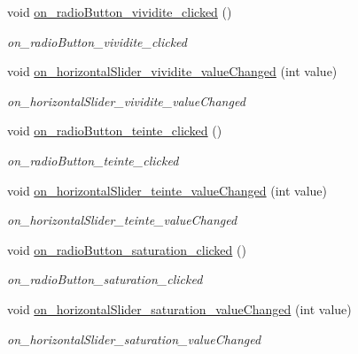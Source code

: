 \begin{DoxyCompactItemize}
\mbox{\label{classMainWindow_a56fc0fe0a0c6150aef0d877f219d666d}} 
void \hyperlink{classMainWindow_a56fc0fe0a0c6150aef0d877f219d666d}{on\+\_\+radio\+Button\+\_\+vividite\+\_\+clicked} ()
\begin{DoxyCompactList}\small\item\em on\+\_\+radio\+Button\+\_\+vividite\+\_\+clicked \end{DoxyCompactList}\item 
void \hyperlink{classMainWindow_a942e6acdcf4b25419e338bd17b663930}{on\+\_\+horizontal\+Slider\+\_\+vividite\+\_\+value\+Changed} (int value)
\begin{DoxyCompactList}\small\item\em on\+\_\+horizontal\+Slider\+\_\+vividite\+\_\+value\+Changed \end{DoxyCompactList}\item 
\mbox{\label{classMainWindow_a313f05860248e6079a494d57308c17f7}} 
void \hyperlink{classMainWindow_a313f05860248e6079a494d57308c17f7}{on\+\_\+radio\+Button\+\_\+teinte\+\_\+clicked} ()
\begin{DoxyCompactList}\small\item\em on\+\_\+radio\+Button\+\_\+teinte\+\_\+clicked \end{DoxyCompactList}\item 
void \hyperlink{classMainWindow_ac4163b8831a31c30a30a09947cb67a25}{on\+\_\+horizontal\+Slider\+\_\+teinte\+\_\+value\+Changed} (int value)
\begin{DoxyCompactList}\small\item\em on\+\_\+horizontal\+Slider\+\_\+teinte\+\_\+value\+Changed \end{DoxyCompactList}\item 
\mbox{\label{classMainWindow_a69d3be028b0f27bbccc93da966be4de8}} 
void \hyperlink{classMainWindow_a69d3be028b0f27bbccc93da966be4de8}{on\+\_\+radio\+Button\+\_\+saturation\+\_\+clicked} ()
\begin{DoxyCompactList}\small\item\em on\+\_\+radio\+Button\+\_\+saturation\+\_\+clicked \end{DoxyCompactList}\item 
void \hyperlink{classMainWindow_a0f51359ee25e28f44d1d39c0f16f5082}{on\+\_\+horizontal\+Slider\+\_\+saturation\+\_\+value\+Changed} (int value)
\begin{DoxyCompactList}\small\item\em on\+\_\+horizontal\+Slider\+\_\+saturation\+\_\+value\+Changed \end{DoxyCompactList}\item 

\end{DoxyCompactItemize}
